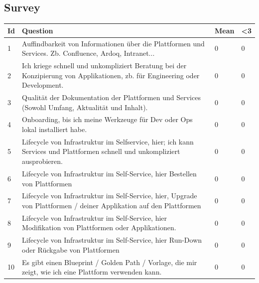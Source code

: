 \documentclass[a4paper,12pt]{article}
\begin{document}
    \subsection{Survey}
    \label{subsec:survey}
    \begin{table}[!htbp]
        \begin{center}
            \begin{tabularx}{\textwidth}{lXll}
                \toprule
                Id & Question                                                                                                                                                                              & Mean & <3 \\
                \midrule
                1  & Auffindbarkeit von Informationen über die Plattformen und Services. Zb. Confluence, Ardoq, Intranet... & 0 & 0         \\
                2  & Ich kriege schnell und unkompliziert Beratung bei der Konzipierung von Applikationen, zb. für Engineering oder Development. & 0 & 0  \\
                3  & Qualität der Dokumentation der Plattformen und Services (Sowohl Umfang, Aktualität und Inhalt). & 0 & 0  \\
                4  & Onboarding, bis ich meine Werkzeuge für Dev oder Ops lokal installiert habe.                                                                                                          & 0 & 0  \\
                5  & Lifecycle von Infrastruktur im Selfservice, hier; ich kann Services und Plattformen schnell und unkompliziert ausprobieren.  & 0 & 0  \\
                6  & Lifecycle von Infrastruktur im Self-Service, hier Bestellen von Plattformen                                                                                                           & 0    & 0  \\
                7  & Lifecycle von Infrastruktur im Self-Service, hier, Upgrade von Plattformen / deiner Applikation auf den Plattformen & 0 & 0  \\
                8  & Lifecycle von Infrastruktur im Self-Service, hier Modifikation von Plattformen oder Applikationen. & 0 & 0  \\
                9  & Lifecycle von Infrastruktur im Self-Service, hier Run-Down oder Rückgabe von Plattformen & 0 & 0  \\
                10 & Es gibt einen Blueprint / Golden Path / Vorlage, die mir zeigt, wie ich eine Plattform verwenden kann. & 0 & 0  \\

\end{tabularx}
\end{center}
\end{table}
\end{document}
